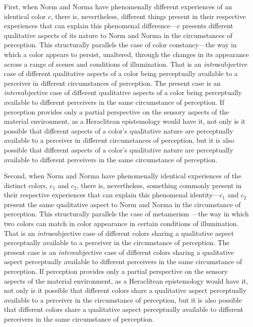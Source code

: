 \documentclass[12pt]{article}
\begin{document}
First, when Norm and Norma have phenomenally different experiences of an identical color $c$, there is, nevertheless, different things present in their respective experiences that can explain this phenomenal difference---$c$ presents different qualitative aspects of its nature to Norm and Norma in the circumstances of perception. This structurally parallels the case of color constancy---the way in which a color appears to persist, unaltered, through the changes in its appearance across a range of scenes and conditions of illumination. That is an \emph{intra}subjective case of different qualitative aspects of a color being perceptually available to a perceiver in different circumstances of perception. The present case is an \emph{inter}subjective case of different qualitative aspects of a color being perceptually available to different perceivers in the same circumstance of perception. If perception provides only a partial perspective on the sensory aspects of the material environment, as a Heraclitean epistemology would have it, not only is it possible that different aspects of a color's qualitative nature are perceptually available to a perceiver in different circumstances of perception, but it is also possible that different aspects of a color's qualitative nature are perceptually available to different perceivers in the same circumstance of perception.

Second, when Norm and Norma have phenomenally identical experiences of the distinct colors, $c_1$ and $c_2$, there is, nevertheless, something commonly present in their respective experiences that can explain this phenomenal identi\-ty---$c_1$ and $c_2$ present the same qualitative aspect to Norm and Norma in the circumstance of perception. This structurally parallels the case of metamerism ---the way in which two colors can match in color appearance in certain conditions of illumination. That is an \emph{intra}subjective case of different colors sharing a qualitative aspect perceptually available to a perceiver in the circumstance of perception. The present case is an \emph{inter}subjective case of different colors sharing a qualitative aspect perceptually available to different perceivers in the same circumstance of perception. If perception provides only a partial perspective on the sensory aspects of the material environment, as a Heraclitean epistemology would have it, not only is it possible that different colors share a qualitative aspect perceptually available to a perceiver in the circumstance of perception, but it is also possible that different colors share a qualitative aspect perceptually available to different perceivers in the same circumstance of perception.
\end{document}
